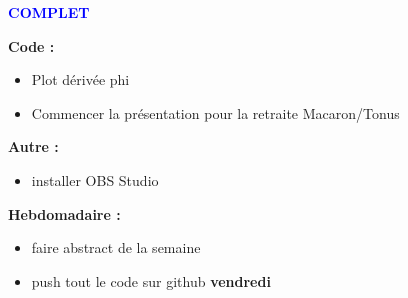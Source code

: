 \textcolor{blue}{\textbf{\large{COMPLET}}}

\textbf{Code :}
\begin{itemize}[label=$\square$] 
	\item[\done] Plot dérivée phi
	\item[\done] Commencer la présentation pour la retraite Macaron/Tonus
\end{itemize}
\textbf{Autre :}
\begin{itemize}[label=$\square$] 
	\item[\done] installer OBS Studio
\end{itemize}
\textbf{Hebdomadaire :}
\begin{itemize}[label=$\square$] 
	\item[\done] faire abstract de la semaine 
	\item[\done] push tout le code sur github \textbf{vendredi}
\end{itemize}